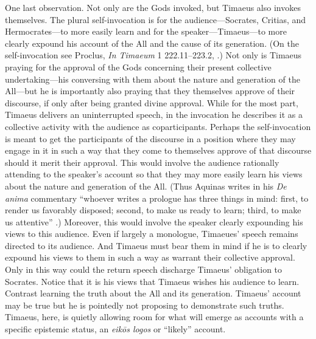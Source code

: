One last observation. Not only are the Gods invoked, but Timaeus also invokes themselves. The plural self-invocation is for the audience---Socrates, Critias, and Herm\-ocrates---to more easily learn and for the speaker---Timaeus---to more clearly expound his account of the All and the cause of its generation. (On the self-invocation see Proclus, \emph{In Timaeum} 1 222.11--223.2, \citealt{Diehl:1903re}.) Not only is Timaeus praying for the approval of the Gods concerning their present collective undertaking---his conversing with them about the nature and generation of the All---but he is importantly also praying that they themselves approve of their discourse, if only after being granted divine approval. While for the most part, Timaeus delivers an uninterrupted speech, in the invocation he describes it as a collective activity with the audience as coparticipants. Perhaps the self-invocation is meant to get the participants of the discourse in a position where they may engage in it in such a way that they come to themselves approve of that discourse should it merit their approval. This would involve the audience rationally attending to the speaker's account so that they may more easily learn his views about the nature and generation of the All. (Thus Aquinas writes in his \emph{De anima} commentary ``whoever writes a prologue has three things in mind: first, to render us favorably  disposed; second, to make us ready to learn; third, to make us attentive'' \citealt[5]{Pasnau:1999pd}.) Moreover, this would involve the speaker clearly expounding his views to this audience. Even if largely a monologue, Timaeues' speech remains directed to its audience. And Timaeus must bear them in mind if he is to clearly expound his views to them in such a way as warrant their collective approval. Only in this way could the return speech discharge Timaeus' obligation to Socrates. Notice that it is his views that Timaeus wishes his audience to learn. Contrast learning the truth about the All and its generation. Timaeus' account may be true but he is pointedly not proposing to demonstrate such truths. Timaeus, here, is quietly allowing room for what will emerge as accounts with a specific epistemic status, an \emph{eikōs logos} or ``likely'' account.


